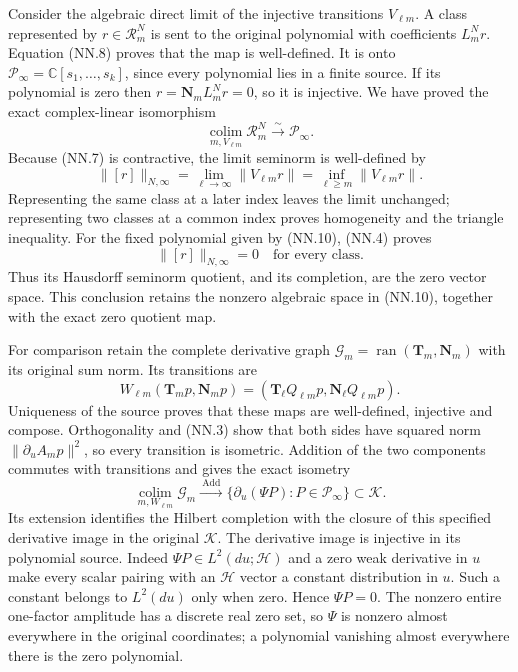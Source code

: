 Consider the algebraic direct limit of the injective transitions
\(V_{\ell m}\). A class represented by \(r\in\mathscr R_m^N\)
is sent to the original polynomial with coefficients \(L_m^Nr\).
Equation (NN.8) proves that the map is well-defined. It is onto
\(\mathcal P_\infty=\mathbb C[s_1,\ldots,s_k]\), since every
polynomial lies in a finite source. If its polynomial is zero then
\(r=\boldsymbol N_m L_m^Nr=0\), so it is injective. We have proved
the exact complex-linear isomorphism
\[
 \underset{m,V_{\ell m}}{\operatorname{colim}}\mathscr R_m^N
       \xrightarrow{\ \sim\ }\mathcal P_\infty.
 \tag{NN.10}
\]
Because (NN.7) is contractive, the limit seminorm is well-defined by
\[
 \|[r]\|_{N,\infty}
       =\lim_{\ell\to\infty}\|V_{\ell m}r\|
       =\inf_{\ell\ge m}\|V_{\ell m}r\|.
 \tag{NN.11}
\]
Representing the same class at a later index leaves the limit unchanged;
representing two classes at a common index proves homogeneity and the
triangle inequality. For the fixed polynomial given by (NN.10), (NN.4)
proves
\[
       \|[r]\|_{N,\infty}=0\quad\text{for every class}.
 \tag{NN.12}
\]
Thus its Hausdorff seminorm quotient, and its completion, are the zero
vector space. This conclusion retains the nonzero algebraic space in
(NN.10), together with the exact zero quotient map.

For comparison retain the complete derivative graph
\(\mathscr G_m=\operatorname{ran}(\boldsymbol T_m,\boldsymbol N_m)\)
with its original sum norm. Its transitions are
\[
 W_{\ell m}(\boldsymbol T_m p,\boldsymbol N_m p)
       =(\boldsymbol T_\ell Q_{\ell m}p,
                            \boldsymbol N_\ell Q_{\ell m}p).
 \tag{NN.13}
\]
Uniqueness of the source proves that these maps are well-defined,
injective and compose. Orthogonality and (NN.3) show that both sides
have squared norm \(\|\partial_u A_m p\|^2\), so every transition
is isometric. Addition of the two components commutes with transitions
and gives the exact isometry
\[
 \underset{m,W_{\ell m}}{\operatorname{colim}}\mathscr G_m
    \xrightarrow{\ \operatorname{Add}\ }
    \{\partial_u(\Psi P):P\in\mathcal P_\infty\}\subset\mathscr K.
 \tag{NN.14}
\]
Its extension identifies the Hilbert completion with the closure of
this specified derivative image in the original \(\mathscr K\).
The derivative image is injective in its polynomial source. Indeed
\(\Psi P\in L^2(du;\mathscr H)\) and a zero weak derivative in
\(u\) make every scalar pairing with an \(\mathscr H\) vector a
constant distribution in \(u\). Such a constant belongs to
\(L^2(du)\) only when zero. Hence \(\Psi P=0\). The nonzero
entire one-factor amplitude has a discrete real zero set, so \(\Psi\)
is nonzero almost everywhere in the original coordinates; a polynomial
vanishing almost everywhere there is the zero polynomial.

